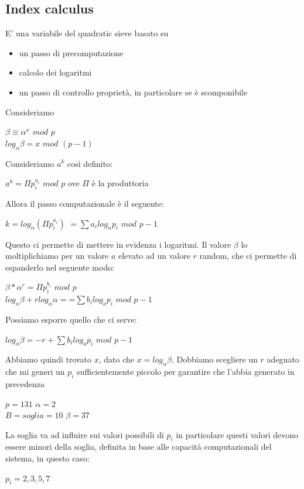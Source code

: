 \documentclass[11pt, oneside]{article}   	%
\begin{document}
\subsection*{Index calculus}
E' una variabile del quadratic sieve basato su \begin{itemize}
\item un passo di precomputazione
\item calcolo dei logaritmi 
\item un passo di controllo proprietà, in particolare se è scomponibile
\end{itemize}
Consideriamo\\
\begin{center}
$\beta \equiv \alpha^x$ $mod$ $p$\\
$log_\alpha \beta = x$ $mod$ $(p-1)$
\end{center}
Consideriamo $a^k$ così definito:
\begin{center}
$a^k = \Pi p_i^{a_i}$ $mod$ $p$ ove $\Pi$ è la produttoria 
\end{center}
Allora il passo computazionale è il seguente:
\begin{center}
$k = log_\alpha (\Pi p_i ^{a_i})$
$= \sum a_i log_\alpha p_i$ $mod$ $p-1$
\end{center}
Questo ci permette di mettere in evidenza i logaritmi.
Il valore $\beta$ lo moltiplichiamo per un valore $a$ elevato ad un valore $r$ random, che ci permette di espanderlo nel seguente modo:
\begin{center}
$\beta * \alpha ^ r = \Pi p_i^{b_i}$ $mod$ $p$\\
$log_\alpha \beta + r log_\alpha \alpha = 
$=$ \sum b_i log_a p_i$ $mod$ $p-1$
\end{center}
Possiamo esporre quello che ci serve:
\begin{center}
$log_\alpha \beta = -r + \sum b_i log_a p_i$ $mod$ $p-1$
\end{center}
Abbiamo quindi trovato $x$, dato che $x = log_\alpha \beta$. Dobbiamo scegliere un $r$ adeguato che mi generi un $p_i$ sufficientemente piccolo per garantire che l'abbia generato in precedenza
\begin{center}
$p = 131$ $\alpha = 2$\\
$B = soglia = 10$ $\beta = 37$
\end{center}
La soglia va ad influire sui valori possibili di $p_i$ in particolare questi valori devono essere minori della soglia, definita in base alle capacità computazionali del sistema, in questo caso:
\begin{center}
$p_i = 2, 3, 5, 7$
\end{center}
\end{document}
